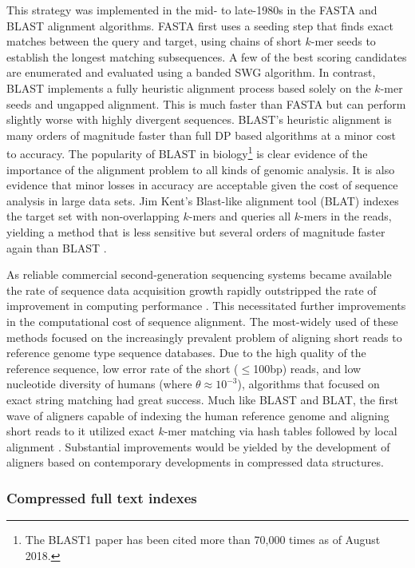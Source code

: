 This strategy was implemented in the mid- to late-1980s in the FASTA \cite{pearson1988improved} and BLAST \cite{altschul1990basic} alignment algorithms.
FASTA first uses a seeding step that finds exact matches between the query and target, using chains of short $k$-mer seeds to establish the longest matching subsequences.
A few of the best scoring candidates are enumerated and evaluated using a banded SWG algorithm.
In contrast, BLAST implements a fully heuristic alignment process based solely on the $k$-mer seeds and ungapped alignment.
This is much faster than FASTA but can perform slightly worse with highly divergent sequences.
BLAST's heuristic alignment is many orders of magnitude faster than full DP based algorithms at a minor cost to accuracy.
The popularity of BLAST in biology\footnote{The BLAST1 paper has been cited more than 70,000 times as of August 2018.} is clear evidence of the importance of the alignment problem to all kinds of genomic analysis.
It is also evidence that minor losses in accuracy are acceptable given the cost of sequence analysis in large data sets.
Jim Kent's Blast-like alignment tool (BLAT) indexes the target set with non-overlapping $k$-mers and queries all $k$-mers in the reads, yielding a method that is less sensitive but several orders of magnitude faster again than BLAST \cite{kent2002blat}.

As reliable commercial second-generation sequencing systems became available the rate of sequence data acquisition growth rapidly outstripped the rate of improvement in computing performance \cite{leinonen2010sequence,kodama2011sequence}.
This necessitated further improvements in the computational cost of sequence alignment.
The most-widely used of these methods focused on the increasingly prevalent problem of aligning short reads to reference genome type sequence databases.
Due to the high quality of the reference sequence, low error rate of the short ($\leq$100bp) reads, and low nucleotide diversity of humans (where $\theta \approx 10^{-3}$), algorithms that focused on exact string matching had great success.
Much like BLAST and BLAT, the first wave of aligners capable of indexing the human reference genome and aligning short reads to it utilized exact $k$-mer matching via hash tables followed by local alignment \cite{li2008soap,lee2014mosaik,li2008mapping}.
Substantial improvements would be yielded by the development of aligners based on contemporary developments in compressed data structures.

\subsubsection{Compressed full text indexes}
\label{sec:compressed_full_text_indexes}

